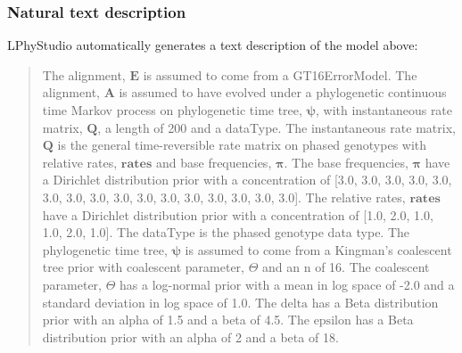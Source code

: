 \documentclass[10pt,letterpaper,table]{article}
\begin{document}
\subsubsection*{Natural text description}
\noindent LPhyStudio automatically generates a text description of the model above:
\begin{quote}
The alignment, $\boldsymbol{E}$ is assumed to come from a GT16ErrorModel.
The alignment, $\boldsymbol{A}$ is assumed to have evolved under a phylogenetic continuous time Markov process \cite{felsenstein1981} on  phylogenetic time tree, $\boldsymbol{\psi}$, with  instantaneous rate matrix, $\boldsymbol{Q}$, a length of 200 and a dataType.
The instantaneous rate matrix, $\boldsymbol{Q}$ is the general time-reversible rate matrix on phased genotypes \cite{kozlov2022cellphy} with relative rates, $\boldsymbol{\textbf{rates}}$ and base frequencies, $\boldsymbol{\pi}$.
The base frequencies, $\boldsymbol{\pi}$ have a Dirichlet distribution prior with a concentration of [3.0, 3.0, 3.0, 3.0, 3.0, 3.0, 3.0, 3.0, 3.0, 3.0, 3.0, 3.0, 3.0, 3.0, 3.0, 3.0].
The relative rates, $\boldsymbol{\textbf{rates}}$ have a Dirichlet distribution prior with a concentration of [1.0, 2.0, 1.0, 1.0, 2.0, 1.0].
The dataType is the phased genotype data type.
The phylogenetic time tree, $\boldsymbol{\psi}$ is assumed to come from a Kingman's coalescent tree prior \cite{kingman82} with  coalescent parameter, $\Theta$ and an n of 16.
The coalescent parameter, $\Theta$ has a log-normal prior with a mean in log space of -2.0 and a standard deviation in log space of 1.0.
The $\textrm{delta}$ has a Beta distribution prior with an alpha of 1.5 and a beta of 4.5.
The $\textrm{epsilon}$ has a Beta distribution prior with an alpha of 2 and a beta of 18.
\end{quote}
\end{document}
